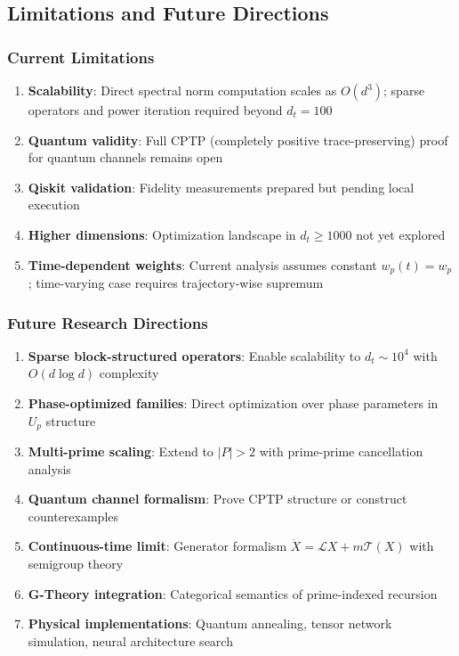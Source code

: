 \documentclass[11pt,a4paper]{article}
\begin{document}
\subsection{Limitations and Future Directions}

\subsubsection{Current Limitations}

\begin{enumerate}
\item \textbf{Scalability}: Direct spectral norm computation scales as \(O(d^3)\); sparse operators and power iteration required beyond \(d_t=100\)
\item \textbf{Quantum validity}: Full CPTP (completely positive trace-preserving) proof for quantum channels remains open
\item \textbf{Qiskit validation}: Fidelity measurements prepared but pending local execution
\item \textbf{Higher dimensions}: Optimization landscape in \(d_t \geq 1000\) not yet explored
\item \textbf{Time-dependent weights}: Current analysis assumes constant \(w_p(t) = w_p\); time-varying case requires trajectory-wise supremum
\end{enumerate}

\subsubsection{Future Research Directions}

\begin{enumerate}
\item \textbf{Sparse block-structured operators}: Enable scalability to \(d_t \sim 10^4\) with \(O(d \log d)\) complexity
\item \textbf{Phase-optimized families}: Direct optimization over phase parameters in \(U_p\) structure
\item \textbf{Multi-prime scaling}: Extend to \(|P| > 2\) with prime-prime cancellation analysis
\item \textbf{Quantum channel formalism}: Prove CPTP structure or construct counterexamples
\item \textbf{Continuous-time limit}: Generator formalism \(\dot{X} = \mathcal{L}X + m\mathcal{T}(X)\) with semigroup theory
\item \textbf{G-Theory integration}: Categorical semantics of prime-indexed recursion
\item \textbf{Physical implementations}: Quantum annealing, tensor network simulation, neural architecture search
\end{enumerate}
\end{document}
